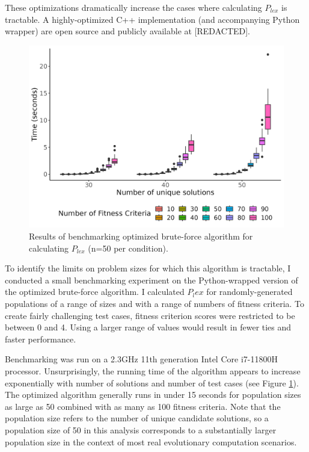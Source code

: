 \documentclass[sigconf]{acmart}
\begin{document}
These optimizations dramatically increase the cases where calculating $P_{lex}$ is tractable. A highly-optimized C++ implementation (and accompanying Python wrapper) are open source and publicly available at [REDACTED].

\begin{figure}
    \centering
    \includegraphics[width=\linewidth]{figs/benchmark.png}
    \caption{Results of benchmarking optimized brute-force algorithm for calculating $P_{lex}$ (n=50 per condition).}
    \label{fig:benchmark}
\end{figure}

To identify the limits on problem sizes for which this algorithm is tractable, I conducted a small benchmarking experiment on the Python-wrapped version of the optimized brute-force algorithm. I calculated $P_lex$ for randomly-generated populations of a range of sizes and with a range of numbers of fitness criteria. To create fairly challenging test cases, fitness criterion scores were restricted to be between 0 and 4. Using a larger range of values would result in fewer ties and faster performance.

Benchmarking was run on a 2.3GHz 11th generation Intel Core i7-11800H processor. Unsurprisingly, the running time of the algorithm appears to increase exponentially with number of solutions and number of test cases (see Figure \ref{fig:benchmark}). The optimized algorithm generally runs in under 15 seconds for population sizes as large as 50 combined with as many as 100 fitness criteria. Note that the population size refers to the number of unique candidate solutions, so a population size of 50 in this analysis corresponds to a substantially larger population size in the context of most real evolutionary computation scenarios.
\end{document}
